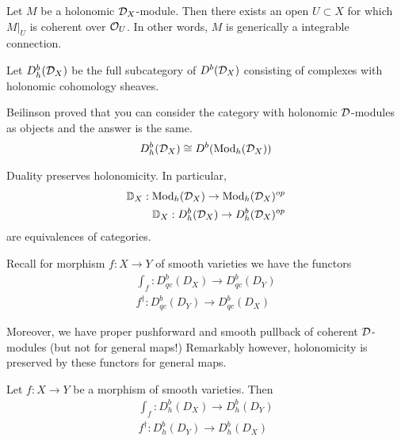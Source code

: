\begin{proposition}
	Let $M$ be a holonomic ${\mathcal{D}}_X$-module. Then there
	exists an open $U\subset X$ for which $M|_U$ is coherent over ${\mathcal{O}}_U$.
	In other words, $M$ is generically a integrable connection.
\end{proposition}

\begin{definition}
	Let $D^b_h({\mathcal{D}}_X)$ be the full subcategory of $D^b({\mathcal{D}}_X)$ consisting of complexes with
	holonomic cohomology sheaves.
\end{definition}

\begin{remark}
	Beilinson proved that you can consider the category with holonomic ${\mathcal{D}}$-modules as objects and the answer is the same.
	\begin{align*}
		D^b_h({\mathcal{D}}_X) \cong D^b(\operatorname{Mod}_h({\mathcal{D}}_X))
	\end{align*}
\end{remark}

\begin{proposition}
	Duality preserves holonomicity. In particular,
	\begin{align*}
		\mathbb{D}_X:\operatorname{Mod}_h({\mathcal{D}}_X) \to \operatorname{Mod}_h({\mathcal{D}}_X)^{op} \\
		\mathbb{D}_X: D^b_h({\mathcal{D}}_X) \to D^b_h({\mathcal{D}}_X)^{op}
	\end{align*} are equivalences of categories.
\end{proposition}

Recall for morphism $f:X\to Y$ of smooth varieties we have the  functors \begin{align*}
	\int_f: D^b_{qc}(D_X) \to D^b_{qc}(D_Y) \\
	f^\dagger: D^b_{qc}(D_Y) \to D^b_{qc}(D_X)
\end{align*}

Moreover, we have proper pushforward and smooth pullback of coherent ${\mathcal{D}}$-modules (but not for general maps!)
Remarkably however, holonomicity is preserved by these functors for general maps.

\begin{theorem}
	Let $f:X\to Y$ be a morphism of smooth varieties. Then \begin{align*}
		\int_f: D^b_h(D_X) \to D^b_h(D_Y) \\
		f^\dagger: D^b_h(D_Y) \to D^b_h(D_X)
	\end{align*}
\end{theorem}

